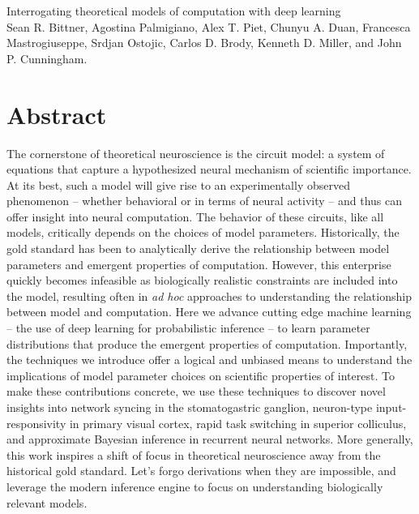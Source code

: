 \documentclass[11pt]{article}
\begin{document}
\medskip                        %

\thispagestyle{plain}
{\Large Interrogating theoretical models of computation with deep learning} \\
Sean R. Bittner, Agostina Palmigiano, Alex T. Piet, Chunyu A. Duan, Francesca Mastrogiuseppe, Srdjan Ostojic, Carlos D. Brody, Kenneth D. Miller, and John P. Cunningham.

\linenumbers
\section{Abstract}
The cornerstone of theoretical neuroscience is the circuit model: a system of equations that capture a hypothesized neural mechanism of scientific importance.  At its best, such a model will give rise to an experimentally observed phenomenon -- whether behavioral or in terms of neural activity -- and thus can offer insight into neural computation.  The behavior of these circuits, like all models, critically depends on the choices of model parameters.  Historically, the gold standard has been to analytically derive the relationship between model parameters and emergent properties of computation.  However, this enterprise quickly becomes infeasible as biologically realistic constraints are included into the model, resulting often in \emph{ad hoc} approaches to understanding the relationship between model and computation.  Here we advance cutting edge machine learning -- the use of deep learning for probabilistic inference -- to learn parameter distributions that produce the emergent properties of computation.   Importantly, the techniques we introduce offer a logical and unbiased means to understand the implications of model parameter choices on scientific properties of interest.  To make these contributions concrete, we use these techniques to discover novel insights into network syncing in the stomatogastric ganglion, neuron-type input-responsivity in primary visual cortex, rapid task switching in superior colliculus, and approximate Bayesian inference in recurrent neural networks. More generally, this work inspires a shift of focus in theoretical neuroscience away from the historical gold standard. Let's forgo derivations when they are impossible, and leverage the modern inference engine to focus on understanding biologically relevant models.
\end{document}
